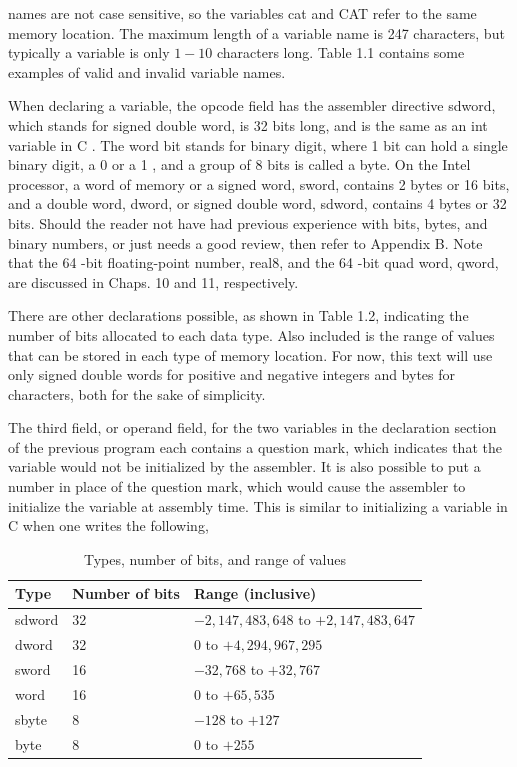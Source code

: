 \documentclass[10pt]{book}
\begin{document}
names are not case sensitive, so the variables cat and CAT refer to the same memory location. The maximum length of a variable name is 247 characters, but typically a variable is only $1-10$ characters long. Table 1.1 contains some examples of valid and invalid variable names.

When declaring a variable, the opcode field has the assembler directive sdword, which stands for signed double word, is 32 bits long, and is the same as an int variable in C . The word bit stands for binary digit, where 1 bit can hold a single binary digit, a 0 or a 1 , and a group of 8 bits is called a byte. On the Intel processor, a word of memory or a signed word, sword, contains 2 bytes or 16 bits, and a double word, dword, or signed double word, sdword, contains 4 bytes or 32 bits. Should the reader not have had previous experience with bits, bytes, and binary numbers, or just needs a good review, then refer to Appendix B. Note that the 64 -bit floating-point number, real8, and the 64 -bit quad word, qword, are discussed in Chaps. 10 and 11, respectively.

There are other declarations possible, as shown in Table 1.2, indicating the number of bits allocated to each data type. Also included is the range of values that can be stored in each type of memory location. For now, this text will use only signed double words for positive and negative integers and bytes for characters, both for the sake of simplicity.

The third field, or operand field, for the two variables in the declaration section of the previous program each contains a question mark, which indicates that the variable would not be initialized by the assembler. It is also possible to put a number in place of the question mark, which would cause the assembler to initialize the variable at assembly time. This is similar to initializing a variable in C when one writes the following,

\begin{table}[t]
\centering
\begin{tabular}{|l|l|l|}
\hline
Type & Number of bits & Range (inclusive) \\
\hline
sdword & 32 & $-2,147,483,648$ to $+2,147,483,647$ \\
\hline
dword & 32 & 0 to $+4,294,967,295$ \\
\hline
sword & 16 & $-32,768$ to $+32,767$ \\
\hline
word & 16 & 0 to $+65,535$ \\
\hline
sbyte & 8 & $-128$ to $+127$ \\
\hline
byte & 8 & 0 to $+255$ \\
\hline
\end{tabular}
\caption{Types, number of bits, and range of values}
\end{table}
\end{document}
